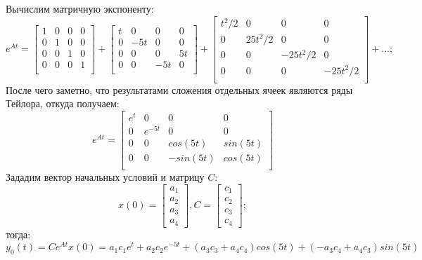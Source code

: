 \documentclass[16pt]{article}
\begin{document}
Вычислим матричную экспоненту: 
\[
    e^{At} = \begin{bmatrix}
        1 & 0 & 0 & 0 \\
        0 & 1 & 0 & 0 \\
        0 & 0 & 1 & 0 \\
        0 & 0 & 0 & 1 \\
        \end{bmatrix}
        +
        \begin{bmatrix}
            t & 0 & 0 & 0 \\
            0 & -5t & 0 & 0 \\
            0 & 0 & 0 & 5t \\
            0 & 0 & -5t & 0 \\
        \end{bmatrix}
        +
        \begin{bmatrix}
            t^2/2 & 0 & 0 & 0 \\
            0 & 25t^2/2 & 0 & 0 \\
            0 & 0 & -25t^2/2 & 0 \\
            0 & 0 & 0 & -25t^2/2 \\
        \end{bmatrix}
        +
        ...;
\]
После чего заметно, что результатами сложения отдельных ячеек являются ряды Тейлора, откуда получаем:
\[
    e^{At} = \begin{bmatrix}
        e^t & 0 & 0 & 0 \\
        0 & e^{-5t} & 0 & 0 \\
        0 & 0 & cos(5t) & sin(5t) \\
        0 & 0 & -sin(5t) & cos(5t) \\
        \end{bmatrix}
\]
Зададим вектор начальных условий и матрицу \(C\):
\[
    x(0) = \begin{bmatrix}
        a_1 \\ 
        a_2 \\
        a_3 \\
        a_4
        \end{bmatrix},
    C = \begin{bmatrix}
        c_1 \\ 
        c_2 \\
        c_3 \\
        c_4
        \end{bmatrix};
\]
тогда:
\[
    y_0(t) = Ce^{At}x(0) = a_1c_1e^t + a_2c_2e^{-5t} + (a_3c_3 + a_4c_4)cos(5t) + (-a_3c_4+a_4c_3)sin(5t)
\]
\end{document}

